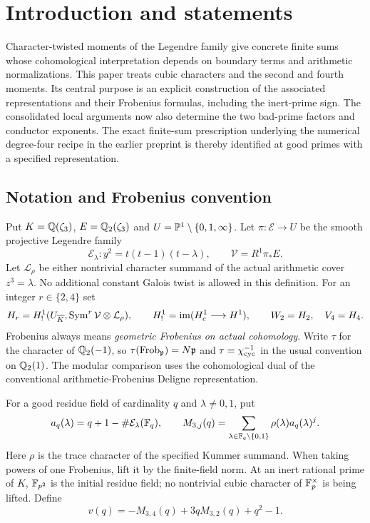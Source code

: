 \section{Introduction and statements}
Character-twisted moments of the Legendre family give concrete finite sums
whose cohomological interpretation depends on boundary terms and arithmetic
normalizations. This paper treats cubic characters and the second and fourth
moments. Its central purpose is an explicit construction of the associated
representations and their Frobenius formulas, including the inert-prime sign. The consolidated local arguments now
also determine the two bad-prime factors and conductor exponents.
The exact finite-sum prescription underlying the numerical degree-four
recipe in the earlier preprint \cite{WalkeV1} is thereby identified
at good primes with a specified representation.

\subsection{Notation and Frobenius convention}
Put $K=\mathbb Q(\zeta_3)$, $E=\mathbb Q_2(\zeta_3)$ and
$U=\mathbb P^1\setminus\{0,1,\infty\}$. Let
$\pi:\mathcal E\to U$ be the smooth projective Legendre family
\[
 \mathcal E_\lambda:y^2=t(t-1)(t-\lambda),\qquad
 \mathcal V=R^1\pi_*E.
\]
Let $\mathcal L_\rho$ be either nontrivial character summand of the actual
arithmetic cover $z^3=\lambda$. No additional constant Galois twist is
allowed in this definition. For an integer $r\in\{2,4\}$ set
\[
 H_r=H^1_!(U_{\overline K},\operatorname{Sym}^r\mathcal V\otimes\mathcal L_\rho),
 \qquad H^1_!=\operatorname{im}(H_c^1\longrightarrow H^1),
 \qquad W_2=H_2,\quad V_4=H_4.
\]
Frobenius always means \emph{geometric Frobenius on actual cohomology}.
Write $\tau$ for the character of $\mathbb Q_2(-1)$, so
$\tau(\operatorname{Frob}_{\mathfrak p})=N\mathfrak p$ and
$\tau=\chi_{\rm cyc}^{-1}$ in the usual convention on $\mathbb Q_2(1)$.
The modular comparison uses the cohomological dual of the conventional
arithmetic-Frobenius Deligne representation.

For a good residue field of cardinality $q$ and $\lambda\ne0,1$, put
\[
 a_q(\lambda)=q+1-\#\mathcal E_\lambda(\mathbb F_q),\qquad
 M_{3,j}(q)=\sum_{\lambda\in\mathbb F_q\setminus\{0,1\}}
                  \rho(\lambda)a_q(\lambda)^j.
\]
Here $\rho$ is the trace character of the specified Kummer summand.
When taking powers of one Frobenius, lift it by the finite-field norm.
At an inert rational prime of $K$, $\mathbb F_{p^2}$ is the initial residue
field; no nontrivial cubic character of $\mathbb F_p^\times$ is being lifted.
Define
\[
 v(q)=-M_{3,4}(q)+3qM_{3,2}(q)+q^2-1.
\]

